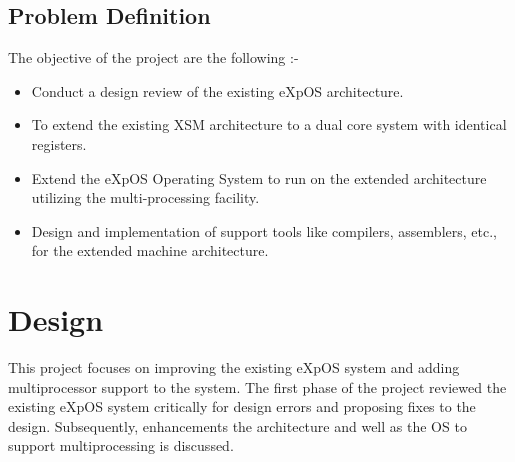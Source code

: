 \documentclass[12pt]{report}
\begin{document}
\section{Problem Definition}
The objective of the project are the following :-
\begin{itemize}
    \item Conduct a design review of the existing eXpOS architecture.
    \item To extend the existing XSM architecture to a dual core system with identical registers.
    \item Extend the eXpOS Operating System to run on the extended architecture utilizing the multi-processing facility.
    \item Design and implementation of support tools like compilers, assemblers, etc., for the extended machine architecture.
\end{itemize}

\chapter{Design}
This project focuses on improving the existing eXpOS system and adding multiprocessor support to the system. The first phase of the project reviewed the existing eXpOS system critically for design errors and proposing fixes to the design. Subsequently, enhancements the architecture and well as the OS to support multiprocessing is discussed.  
\end{document}
